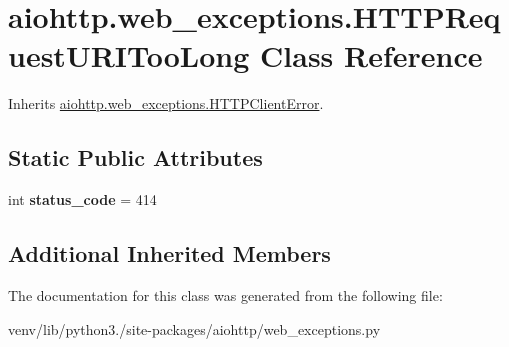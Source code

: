 \hypertarget{classaiohttp_1_1web__exceptions_1_1_h_t_t_p_request_u_r_i_too_long}{}\section{aiohttp.\+web\+\_\+exceptions.\+H\+T\+T\+P\+Request\+U\+R\+I\+Too\+Long Class Reference}
\label{classaiohttp_1_1web__exceptions_1_1_h_t_t_p_request_u_r_i_too_long}


Inherits \hyperlink{classaiohttp_1_1web__exceptions_1_1_h_t_t_p_client_error}{aiohttp.\+web\+\_\+exceptions.\+H\+T\+T\+P\+Client\+Error}.

\subsection*{Static Public Attributes}
\begin{DoxyCompactItemize}
\item 
\mbox{\label{classaiohttp_1_1web__exceptions_1_1_h_t_t_p_request_u_r_i_too_long_ac8662c00ff0a917fb086a89fbf930303}} 
int {\bfseries status\+\_\+code} = 414
\end{DoxyCompactItemize}
\subsection*{Additional Inherited Members}


The documentation for this class was generated from the following file\+:\begin{DoxyCompactItemize}
\item 
venv/lib/python3./site-\/packages/aiohttp/web\+\_\+exceptions.\+py\end{DoxyCompactItemize}
